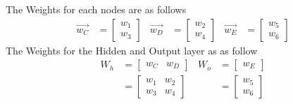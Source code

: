 \documentclass[12pt,english]{article}
\begin{document}
The Weights for each nodes are as follows
\begin{align*} 
\vec{w_C} &= \begin{bmatrix} w_1 \\ w_3 \end{bmatrix} &
\vec{w_D} &= \begin{bmatrix} w_2 \\ w_4 \end{bmatrix} &
\vec{w_E} &= \begin{bmatrix} w_5 \\ w_6 \end{bmatrix}
\end{align*}
The Weights for the Hidden and Output layer as as follow
\begin{align*} 
W_h &= \begin{bmatrix} w_C & w_D \end{bmatrix} &
W_o &= \begin{bmatrix} w_E  \end{bmatrix} \\
&= \begin{bmatrix} w_1 & w_2 \\ w_3 & w_4 \end{bmatrix} &
&= \begin{bmatrix} w_5 \\ w_6 \end{bmatrix}
\end{align*}
\end{document}
